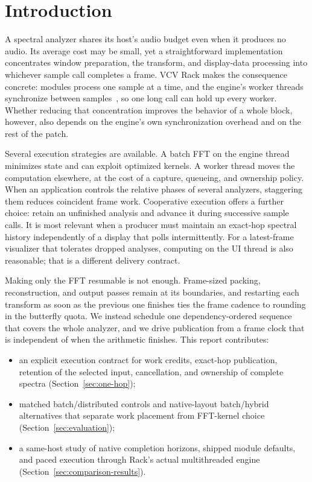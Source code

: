 \section{Introduction}
A spectral analyzer shares its host's audio budget even when it produces no
audio. Its average cost may be small, yet a straightforward implementation
concentrates window preparation, the transform, and display-data processing
into whichever sample call completes a frame. VCV Rack makes the consequence
concrete: modules process one sample at a time, and the engine's worker
threads synchronize between samples~\cite{rackengine}, so one long call can
hold up every worker. Whether reducing that concentration improves the
behavior of a whole block, however, also depends on the engine's own
synchronization overhead and on the rest of the patch.

Several execution strategies are available. A batch FFT on the engine thread
minimizes state and can exploit optimized kernels. A worker thread moves the
computation elsewhere, at the cost of a capture, queueing, and ownership
policy. When an application controls the relative phases of several
analyzers, staggering them reduces coincident frame work. Cooperative
execution offers a further choice: retain an unfinished analysis and advance
it during successive sample calls. It is most relevant when a producer must
maintain an exact-hop spectral history independently of a display that polls
intermittently. For a latest-frame visualizer that tolerates dropped analyses,
computing on the UI thread is also reasonable; that is a different delivery
contract.

Making only the FFT resumable is not enough. Frame-sized packing,
reconstruction, and output passes remain at its boundaries, and restarting
each transform as soon as the previous one finishes ties the frame cadence to
rounding in the butterfly quota. We instead schedule one dependency-ordered
sequence that covers the whole analyzer, and we drive publication from a frame
clock that is independent of when the arithmetic finishes. This report
contributes:
\begin{itemize}
\item an explicit execution contract for work credits, exact-hop publication,
retention of the selected input, cancellation, and ownership of complete
spectra (Section~\ref{sec:one-hop});
\item matched batch/distributed controls and native-layout batch/hybrid
alternatives that separate work placement from FFT-kernel choice
(Section~\ref{sec:evaluation});
\item a same-host study of native completion horizons, shipped module
defaults, and paced execution through Rack's actual multithreaded engine
(Section~\ref{sec:comparison-results}).
\end{itemize}

